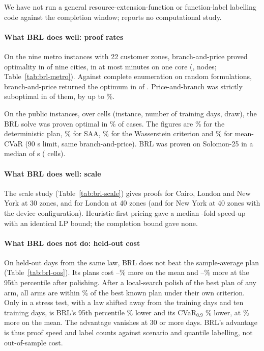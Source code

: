 \documentclass[preprint,11pt]{elsarticle}
\theoremstyle{definition}
\theoremstyle{remark}
\begin{document}
We have not run a general resource-extension-function or function-label labelling code \citep{Dabia2013} against the completion window; \citet{Irnich2008} reports no computational study.

\paragraph{What BRL does well: proof rates} On the nine metro instances with 22 customer zones, branch-and-price proved optimality in \BPoptimalN{} of nine cities, in at most \BPtimeMaxMin{} minutes on one core (\BPtimeMaxCity, \BPnodesMax{} nodes; Table~\ref{tab:brl-metro}). Against complete enumeration on \BPverN{} random formulations, branch-and-price returned the optimum in \BPverExact{} of \BPverN. Price-and-branch was strictly suboptimal in \BPverPBsub{} of them, by up to \BPverPBmax\%.

On the public instances, over \BrlProvenCells{} cells (instance, number of training days, draw), the BRL solve was proven optimal in \BrlProvenBrl\% of cases. The figures are \BrlProvenDet\% for the deterministic plan, \BrlProvenSaa\% for SAA, \BrlProvenWass\% for the Wasserstein criterion and \BrlProvenCvar\% for mean-CVaR (90 s limit, same branch-and-price). BRL was proven on Solomon-25 in a median of \BrlSolomonMedian{} s (\BrlSolomonProvenN{} cells).

\paragraph{What BRL does well: scale} The scale study (Table~\ref{tab:brl-scale}) gives proofs for Cairo, London and New York at 30 zones, and for London at 40 zones (and for New York at 40 zones with the device configuration). Heuristic-first pricing gave a median \BrlHeurSpeedup-fold speed-up with an identical LP bound; the completion bound gave none.

\paragraph{What BRL does not do: held-out cost} On held-out days from the same law, BRL does not beat the sample-average plan (Table~\ref{tab:brl-oos}). Its plans cost \BrlOosMeanMin--\BrlOosMeanMax\% more on the mean and \BrlOosPNineFiveMin--\BrlOosPNineFiveMax\% more at the 95th percentile after polishing. After a local-search polish of the best plan of any arm, all arms are within \BrlPolishedAll\% of the best known plan under their own criterion. Only in a stress test, with a law shifted away from the training days and ten training days, is BRL's 95th percentile \BrlShiftTenPNineFive\% lower and its CVaR$_{0.9}$ \BrlShiftTenCvar\% lower, at \BrlShiftTenMean\% more on the mean. The advantage vanishes at 30 or more days. BRL's advantage is thus proof speed and label counts against scenario and quantile labelling, not out-of-sample cost.
\end{document}
